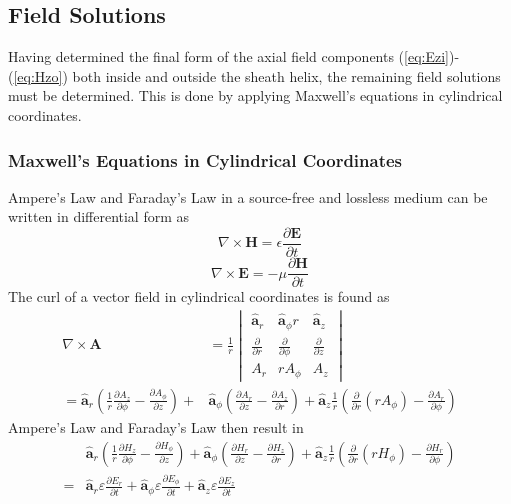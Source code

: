 \subsection{Field Solutions}
Having determined the final form of the axial field components (\ref{eq:Ezi})-(\ref{eq:Hzo}) both inside and outside the sheath helix, the remaining field solutions must be determined. This is done by applying Maxwell's equations in cylindrical coordinates. 
\subsubsection{Maxwell's Equations in Cylindrical Coordinates}
Ampere's Law and Faraday's Law in a source-free and lossless medium can be written in differential form as
\begin{equation}\label{eq:ampere}
	\nabla \times \mathbf{H} = \epsilon \frac{\partial \mathbf{E}}{\partial t}
\end{equation}
\begin{equation}\label{eq:faraday}
	\nabla \times \mathbf{E} = - \mu \frac{\partial \mathbf{H}}{\partial t}
\end{equation}
The curl of a vector field in cylindrical coordinates is found as
\begin{equation}\label{eq:curl}
	\begin{split}
		\nabla \times \mathbf{A} &= \frac{1}{r}
		\begin{vmatrix}
			\hat{\mathbf{a}}_r & \hat{\mathbf{a}}_\phi r & \hat{\mathbf{a}}_z \\
			\frac{\partial}{\partial r} & \frac{\partial}{\partial \phi} & \frac{\partial}{\partial z} \\
			A_r & r A_\phi & A_z
		\end{vmatrix}
		\\
		=
		\hat{\mathbf{a}}_r \left( \frac{1}{r} \frac{\partial A_z}{\partial \phi} - \frac{\partial A_\phi}{\partial z} \right)
		+ &\hat{\mathbf{a}}_\phi \left( \frac{\partial A_r}{\partial z} - \frac{\partial A_z}{\partial r} \right)
		+ \hat{\mathbf{a}}_z \frac{1}{r} \left( \frac{\partial}{\partial r}(r A_\phi) - \frac{\partial A_r}{\partial \phi} \right)
	\end{split}
\end{equation}
Ampere's Law and Faraday's Law then result in 
\begin{equation}\label{eq:ampere1}
	\begin{split}
	&\hat{\mathbf{a}}_r \left( \frac{1}{r} \frac{\partial H_z}{\partial \phi} - \frac{\partial H_\phi}{\partial z} \right)
	+ \hat{\mathbf{a}}_\phi \left( \frac{\partial H_r}{\partial z} - \frac{\partial H_z}{\partial r} \right)
	+ \hat{\mathbf{a}}_z \frac{1}{r} \left( \frac{\partial}{\partial r}(r H_\phi) - \frac{\partial H_r}{\partial \phi} \right) \\
	=
	&\hat{\mathbf{a}}_r \varepsilon \frac{\partial E_r}{\partial t}
	+ \hat{\mathbf{a}}_\phi \varepsilon \frac{\partial E_\phi}{\partial t}
	+ \hat{\mathbf{a}}_z \varepsilon \frac{\partial E_z}{\partial t}
	\end{split}
\end{equation}
